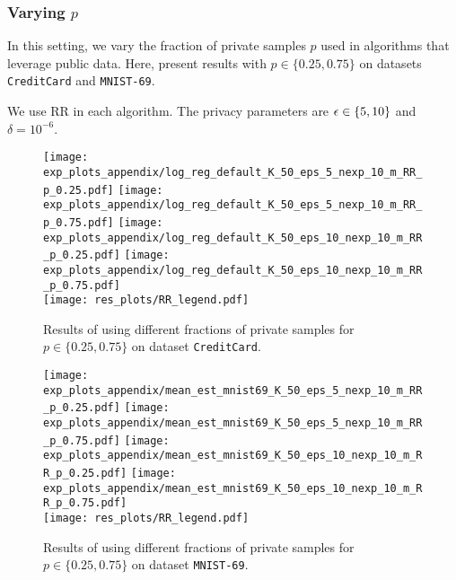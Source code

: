 \subsubsection{Varying $p$}

In this setting, we vary the fraction of private samples $p$ used in algorithms that leverage public data. Here, present results with $p\in \{0.25, 0.75\}$ on datasets \texttt{CreditCard} and \texttt{MNIST-69}.

We use RR in each algorithm. The privacy parameters are ${\epsilon}\in \{5, 10\}$ and $\delta=10^{-6}$.

\begin{figure}[H]
    \centering
    \texttt{[image: exp\_plots\_appendix/log\_reg\_default\_K\_50\_eps\_5\_nexp\_10\_m\_RR\_p\_0.25.pdf]}
    \texttt{[image: exp\_plots\_appendix/log\_reg\_default\_K\_50\_eps\_5\_nexp\_10\_m\_RR\_p\_0.75.pdf]}
    \texttt{[image: exp\_plots\_appendix/log\_reg\_default\_K\_50\_eps\_10\_nexp\_10\_m\_RR\_p\_0.25.pdf]}
    \texttt{[image: exp\_plots\_appendix/log\_reg\_default\_K\_50\_eps\_10\_nexp\_10\_m\_RR\_p\_0.75.pdf]}\\
    \texttt{[image: res\_plots/RR\_legend.pdf]}
    \caption{Results of using different fractions of private samples for $p\in \{0.25, 0.75\}$ on dataset \texttt{CreditCard}.}
    \label{fig:appendix_varying_p_credit_card}
\end{figure}


\begin{figure}[H]
    \centering
    \centering
    \texttt{[image: exp\_plots\_appendix/mean\_est\_mnist69\_K\_50\_eps\_5\_nexp\_10\_m\_RR\_p\_0.25.pdf]}
    \texttt{[image: exp\_plots\_appendix/mean\_est\_mnist69\_K\_50\_eps\_5\_nexp\_10\_m\_RR\_p\_0.75.pdf]}
    \texttt{[image: exp\_plots\_appendix/mean\_est\_mnist69\_K\_50\_eps\_10\_nexp\_10\_m\_RR\_p\_0.25.pdf]}
    \texttt{[image: exp\_plots\_appendix/mean\_est\_mnist69\_K\_50\_eps\_10\_nexp\_10\_m\_RR\_p\_0.75.pdf]}\\
    \texttt{[image: res\_plots/RR\_legend.pdf]}
    \caption{Results of using different fractions of private samples for $p\in \{0.25, 0.75\}$ on dataset \texttt{MNIST-69}.}
    \label{fig:appendix_varying_p_mnist69}
\end{figure}

